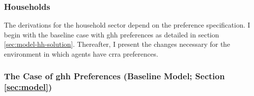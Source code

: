 \documentclass[a4paper,12pt]{article} %
\numberwithin{equation}{section} %
\numberwithin{figure}{section}
\numberwithin{table}{section}
\begin{document}
\begin{refsection}
\begin{appendices}
\subsubsection{Households}
\label{sec-app:full-derivations-households}

The derivations for the household sector depend on the preference specification. I begin with the baseline case with \Gls{ghh} preferences as detailed in section \ref{sec:model-hh-solution}. Thereafter, I present the changes necessary for the environment in which agents have \Gls{crra} preferences.

\subsubsection*{The Case of \Gls{ghh} Preferences (Baseline Model; Section \ref{sec:model})}


\end{appendices}
\end{refsection}
\end{document}

